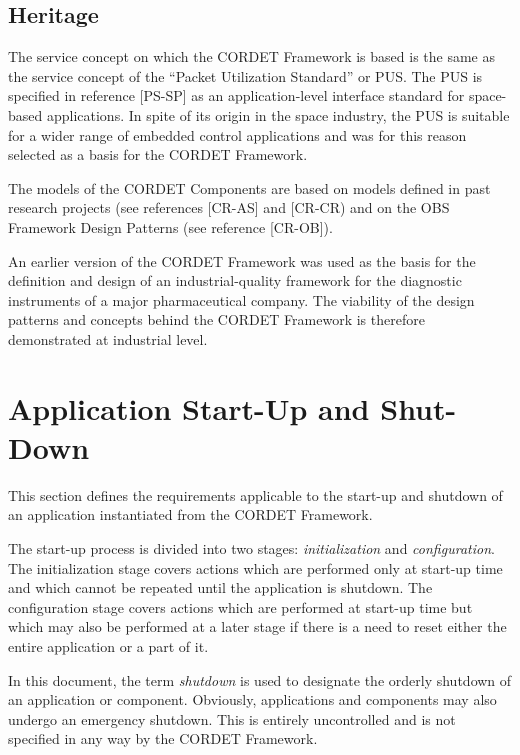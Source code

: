\documentclass{pnp_article}
\begin{document}
\subsection{Heritage}\label{sec:Heritage}
The service concept on which the CORDET Framework is based is the same as the service concept of the “Packet Utilization Standard” or PUS. 
The PUS is specified in reference [PS-SP] as an application-level interface standard for space-based applications. 
In spite of its origin in the space industry, the PUS is suitable for a wider range of embedded control applications and was for this reason selected as a basis for the CORDET Framework. 

The models of the CORDET Components are based on models defined in past research projects (see references [CR-AS] and [CR-CR) and on the OBS Framework Design Patterns (see reference [CR-OB]). 

An earlier version of the CORDET Framework was used as the basis for the definition and design of an industrial-quality framework for the diagnostic instruments of a major pharmaceutical company. The viability of the design patterns and concepts behind the CORDET Framework is therefore demonstrated at industrial level. 

\section{Application Start-Up and Shut-Down}\label{sec:AppStartUpAndShutdown}

This section defines the requirements applicable to the start-up and shutdown of an application instantiated from the CORDET Framework.

The start-up process is divided into two stages: \textit{initialization} and \textit{configuration}. The initialization stage covers actions which are performed only at start-up time and which cannot be repeated until the application is shutdown. The configuration stage covers actions which are performed at start-up time but which may also be performed at a later stage if there is a need to reset either the entire application or a part of it. 

In this document, the term \textit{shutdown} is used to designate the orderly shutdown of an application or component. Obviously, applications and components may also undergo an emergency shutdown. This is entirely uncontrolled and is not specified in any way by the CORDET Framework.
\end{document}
